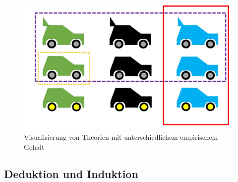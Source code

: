 \documentclass[
  letterpaper,
  DIV=11,
  numbers=noendperiod]{scrreprt}
\begin{document}
\begin{tcolorbox}
\begin{figure}[H]

{\centering \includegraphics{images/empirischergehalt.jpg}

}

\caption{Visualisierung von Theorien mit unterschiedlichem empirischem
Gehalt}

\end{figure}%

\end{tcolorbox}

\subsection{Deduktion und Induktion}\label{deduktion-und-induktion}
\end{document}
